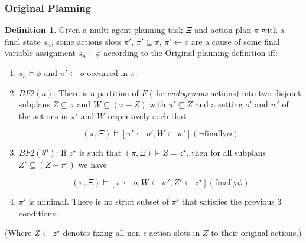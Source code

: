 \documentclass{article}
\theoremstyle{plain}
\theoremstyle{definition}
\newtheorem{defn}[thm]{Definition} %
\begin{document}
\subsubsection*{Original Planning} \label{sec:originalPlanning}
\begin{defn}
Given a multi-agent planning task $\Xi$ and action plan $\pi$ with a final state $s_n$, some actions slots $\pi'$, $\pi' \subseteq \pi$, $\pi' \leftarrow o$ are a cause of some final variable assignment $s_n \models \phi$ according to the Original planning definition iff:
\begin{enumerate}
\item $s_n \models \phi$ and $\pi'\leftarrow o$ occurred in $\pi$.


\item $BF2(a)$: There is a partition of $F$ (the \textit{endogenous} actions) into two disjoint subplans $Z \subseteq \pi$ and $W \subseteq (\pi - Z)$ with $\pi' \subseteq Z$ and a setting $o'$ and $w'$ of the actions in $\pi'$ and $W$ respectively such that

\[
(\pi, \Xi) \models [\pi' \leftarrow o', W \leftarrow w'](\lnot \textrm{finally} \phi)
\]

\item $BF2(b^o)$: If $z^\star$ is such that $(\pi, \Xi) \models Z = z^\star$, then for all subplans $Z' \subseteq (Z - \pi')$ we have

\[
(\pi, \Xi) \models [\pi \leftarrow o, W \leftarrow w', Z' \leftarrow z^\star](\textrm{finally} \phi)
\]

\item $\pi'$ is minimal. There is no strict subset of $\pi'$ that satisfies the previous 3 conditions.
\end{enumerate}
\end{defn}

(Where $Z\leftarrow z^\star$ denotes fixing all non-$\epsilon$ action slots in $Z$ to their original actions.)
\end{document}
